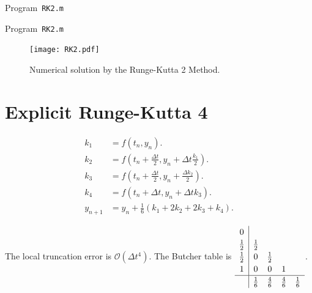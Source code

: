 \begin{listing}[ht!]
	\tiny
	\centering
	\caption{Program~\texttt{RK2.m}}
	\label{code:RK2.m}
\end{listing}

\begin{listing}[ht!]
	\tiny
	\centering
	\caption{Program~\texttt{RK2.m}}
	\label{code:RK2.m}
\end{listing}

\begin{figure}[ht!]
	\centering
	\texttt{[image: RK2.pdf]}
	\caption{Numerical solution by the Runge-Kutta 2 Method.}
\end{figure}

\section{Explicit Runge-Kutta 4}

\begin{align*}
	k_{1}   & =
	f\left(t_{n},y_{n}\right).                                            \\
	k_{2}   & =
	f\left(t_{n}+\frac{\Delta t}{2},y_{n}+\Delta t\frac{k_{1}}{2}\right). \\
	k_{3}   & =
	f\left(t_{n}+\frac{\Delta t}{2},y_{n}+\frac{\Delta k_{2}}{2}\right).  \\
	k_{4}   & =
	f\left(t_{n}+\Delta t,y_{n}+\Delta t k_{3}\right).                    \\
	y_{n+1} & =
	y_{n}+
	\frac{1}{6}\left(k_{1}+2k_{2}+2k_{3}+k_{4}\right).
\end{align*}

The local truncation error is
\begin{math}
	\mathcal{O}
	\left(\Delta t^{4}\right)
\end{math}.
The Butcher table is
\begin{math}
	\renewcommand\arraystretch{1.2}
	\begin{array}
		{c|cccc}
		0           &             &             &             &             \\
		\frac{1}{2} & \frac{1}{2} &             &             &             \\
		\frac{1}{2} & 0           & \frac{1}{2} &             &             \\
		1           & 0           & 0           & 1           &             \\
		\hline
		            & \frac{1}{6} & \frac{4}{6} & \frac{4}{6} & \frac{1}{6}
	\end{array}
\end{math}.

